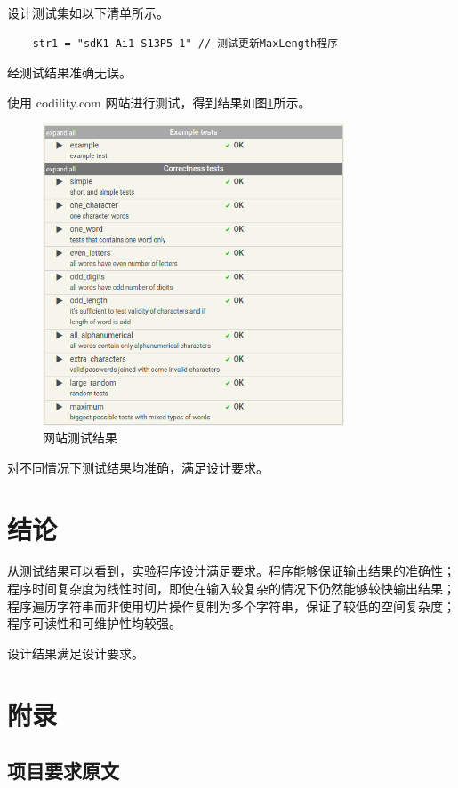 \begin{spacing}{1.5}
    设计测试集如以下清单所示。
\begin{lstlisting}
    str1 = "sdK1 Ai1 S13P5 1" // 测试更新MaxLength程序
\end{lstlisting}

    经测试结果准确无误。

    使用 codility.com 网站进行测试，得到结果如图\ref{fig:test}所示。

\begin{figure}[htbp]
    \centering
    {\includegraphics[width=0.8\textwidth]{./test_result.png}
    \caption{网站测试结果}}
    \label{fig:test}
\end{figure}

    对不同情况下测试结果均准确，满足设计要求。

    \section{结论}
    从测试结果可以看到，实验程序设计满足要求。程序能够保证输出结果的准确性；程序时间复杂度为线性时间，即使在输入较复杂的情况下仍然能够较快输出结果；程序遍历字符串而非使用切片操作复制为多个字符串，保证了较低的空间复杂度；程序可读性和可维护性均较强。

    设计结果满足设计要求。

    \section{附录}
    \subsection{项目要求原文}
    


\end{spacing}
